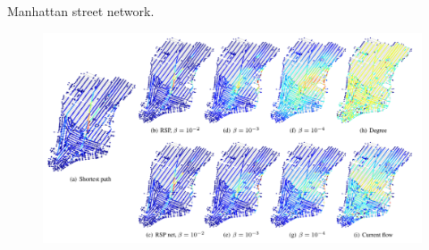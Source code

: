 \documentclass[13pt]{beamer}
\begin{document}
\begin{frame}[t,allowframebreaks]{Manhattan street network.}

    \newpage

    \begin{center}
    \begin{figure}
    \includegraphics[height=0.65\paperheight]{Images/heat2.png}
    \end{figure}
    \end{center}



    \end{frame}
\end{document}
